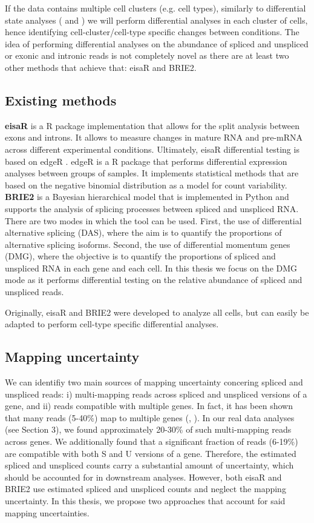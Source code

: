 If the data contains multiple cell clusters (e.g. cell types), similarly to differential state analyses (\cite{muscat} and \cite{distinct}) we will perform differential analyses in each cluster of cells, hence identifying cell-cluster/cell-type specific changes between conditions. The idea of performing differential analyses on the abundance of spliced and unspliced or exonic and intronic reads is not completely novel as there are at least two other methods that achieve that: eisaR and BRIE2.

\subsection{Existing methods}

\textbf{eisaR} \citep{eisar} is a R package implementation that allows for the split analysis between exons and introns. It allows to measure changes in mature RNA and pre-mRNA across different experimental conditions. Ultimately, eisaR differential testing is based on edgeR \citep{edger}. edgeR is a R package that performs differential expression analyses between groups of samples. It implements statistical methods that are based on the negative binomial distribution as a model for count variability. \\

\noindent \textbf{BRIE2} \citep{brie2} is a Bayesian hierarchical model that is implemented in Python and supports the analysis of splicing processes between spliced and unspliced RNA. There are two modes in which the tool can be used. First, the use of differential alternative splicing (DAS), where the aim is to quantify the proportions of alternative splicing isoforms. Second, the use of differential momentum genes (DMG), where the objective is to quantify the proportions of spliced and unspliced RNA in each gene and each cell. In this thesis we focus on the DMG mode as it performs differential testing on the relative abundance of spliced and unspliced reads.

Originally, eisaR and BRIE2 were developed to analyze all cells, but can easily be adapted to perform cell-type specific differential analyses.

\subsection{Mapping uncertainty}
We can identifiy two main sources of mapping uncertainty concering spliced and unspliced reads: i) multi-mapping reads across spliced and unspliced versions of a gene, and ii) reads compatible with multiple genes. In fact, it has been shown that many reads (5-40\%) map to multiple genes (\cite{mapping1}, \cite{mapping2}). In our real data analyses (see Section 3), we found approximately 20-30\% of such multi-mapping reads across genes. We additionally found that a significant fraction of reads (6-19\%) are compatible with both S and U versions of a gene. Therefore, the estimated spliced and unspliced counts carry a substantial amount of uncertainty, which should be accounted for in downstream analyses. However, both eisaR and BRIE2 use estimated spliced and unspliced counts and neglect the mapping uncertainty. In this thesis, we propose two approaches that account for said mapping uncertainties.
